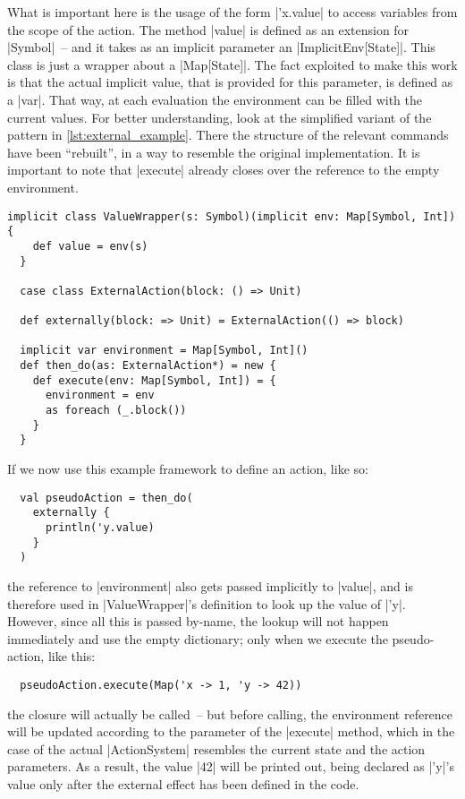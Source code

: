 What is important here is the usage of the form |'x.value| to access variables from the scope of the
action. The method |value| is defined as an extension for |Symbol|~-- and it takes as an implicit
parameter an |ImplicitEnv[State]|. This class is just a wrapper about a |Map[State]|. The fact
exploited to make this work is that the actual implicit value, that is provided for this parameter,
is defined as a |var|. That way, at each evaluation the environment can be filled with the current
values. For better understanding, look at the simplified variant of the pattern in
\autoref{lst:external_example}. There the structure of the relevant commands have been
\enquote{rebuilt}, in a way to resemble the original implementation. It is important to note that
|execute| already closes over the reference to the empty environment.

\begin{lstlisting}[style=floating, label=lst:external_example,
  caption={A simplified example of how the variable capturing in external statements is
    implemented: by capturing an implicit reference, and setting it later to the then current
    environment. \texttt{externally} and \texttt{ValueWrapper} are in reality provided by 
    the mixin \texttt{ExternalActions}; \texttt{ExternalAction} is defined in the statement
    \abbrev{ADT}.}]
  implicit class ValueWrapper(s: Symbol)(implicit env: Map[Symbol, Int]) {
    def value = env(s)
  }

  case class ExternalAction(block: () => Unit)

  def externally(block: => Unit) = ExternalAction(() => block)
  
  implicit var environment = Map[Symbol, Int]()
  def then_do(as: ExternalAction*) = new {
    def execute(env: Map[Symbol, Int]) = {
      environment = env
      as foreach (_.block())
    }
  }
\end{lstlisting}

If we now use this example framework to define an action, like so:
\begin{lstlisting}
  val pseudoAction = then_do(
    externally {
      println('y.value)
    }
  )
\end{lstlisting}
the reference to |environment| also gets passed implicitly to |value|, and is therefore used in
|ValueWrapper|'s definition to look up the value of |'y|. However, since all this is passed by-name,
the lookup will not happen immediately and use the empty dictionary; only when we execute the
pseudo-action, like this:
\begin{lstlisting}
  pseudoAction.execute(Map('x -> 1, 'y -> 42))
\end{lstlisting}
the closure will actually be called~-- but before calling, the environment reference will be updated
according to the parameter of the |execute| method, which in the case of the actual |ActionSystem|
resembles the current state and the action parameters. As a result, the value |42| will be printed
out, being declared as |'y|'s value only after the external effect has been defined in the code.

